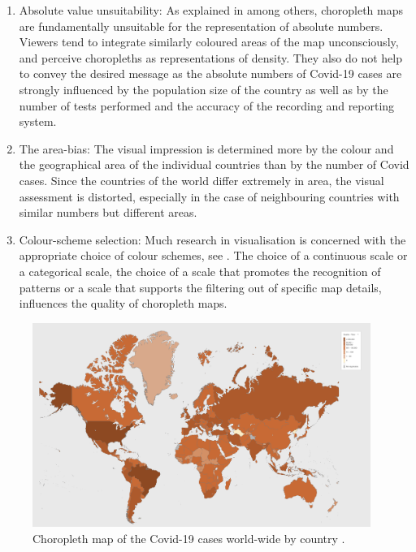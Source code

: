 \documentclass[article]{jdssv}\usepackage[]{graphicx}\usepackage[]{xcolor}
\begin{document}
\begin{enumerate}
\item Absolute value unsuitability: As explained in \citep{monmonier2005, slocum2008, speckmann2010} among others, choropleth maps are fundamentally unsuitable for the representation of absolute numbers. Viewers tend to integrate similarly coloured areas of the map unconsciously, and perceive choropleths as representations of density. They also do not help to convey the desired message as the absolute numbers of Covid-19 cases are strongly influenced by the population size of the country as well as by the number of tests performed and the accuracy of the recording and reporting system. 
\item The area-bias: The visual impression is determined more by the colour and the geographical area of the individual countries than by the number of Covid cases. Since the countries of the world differ extremely in area, the visual assessment is distorted, especially in the case of neighbouring countries with similar numbers but different areas.
\item Colour-scheme selection: Much research in visualisation is concerned with the appropriate choice of colour schemes, see \citep{brewer1997, color2021}. The choice of a continuous scale or a categorical scale, the choice of a scale that promotes the recognition of patterns or a scale that supports the filtering out of specific map details, influences the quality of choropleth maps.
\end{enumerate}

\begin{figure}
	\includegraphics[width = 0.98\textwidth]{Figures_Web/who_totalcases_choro.png}
	\caption{Choropleth map of the Covid-19 cases world-wide by country \citep{WHOCoronavirusCOVID19}.}
	\label{fig:choro1}
\end{figure}
\end{document}
